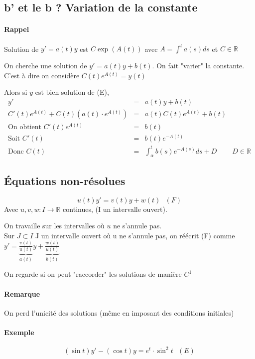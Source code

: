 \subsection{b' et le b ? Variation de la constante}

\paragraph{Rappel} Solution de $y'=a(t)y$ est $C\exp({A(t)})$ avec $A = \int^t a(s)ds$ et $C \in \mathbb{R}$

On cherche une solution de $y'=a(t)y+b(t)$. On fait "varier" la constante. C'est à dire on considère $C(t)e^{A(t)}=y(t)$

Alors si $y$ est bien solution de (E), \[\begin{array}{rclr}
y'&=&a(t)y + b(t) \\
C'(t)e^{A(t)} + C(t)(a(t)\cdot e^{A(t)}) &=& a(t)C(t)e^{A(t)} + b(t) \\
\text{On obtient } C'(t)e^{A(t)} &=& b(t) \\
\text{Soit } C'(t)&=& b(t)e^{-A(t)} \\
\text{Donc } C(t) &=& \int^t_\alpha b(s)e^{-A(s)} ds + D & D \in \mathbb{R} \end{array}\]

\subsection{Équations non-résolues}

\[u(t)y' = v(t)y+w(t) \text{ } (F)\] Avec $u, v, w : I \rightarrow \mathbb{R}$ continues, (I un intervalle ouvert).

On travaille sur les intervalles où $u$ ne s'annule pas. ~\\
Sur $J \subset I$ J un intervalle ouvert où u ne s'annule pas, on réécrit (F) comme $y' = \underbrace{\frac{v(t)}{u(t)}}_{a(t)}y + \underbrace{\frac{w(t)}{u(t)}}_{b(t)} $

On regarde si on peut "raccorder" les solutions de manière $C^1$

\paragraph{Remarque} On perd l'unicité des solutions (même en imposant des conditions initiales)

\paragraph{Exemple} \[(\sin t)y' - (\cos t)y = e^t\cdot\sin^2t \text{ } (E)\]

